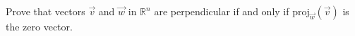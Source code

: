 \begin{problem}
Prove that vectors $\vec{v}$ and $\vec{w}$ in $\mathbb{R}^n$ are perpendicular if and only if $\textrm{proj}_{\vec{w}}(\vec{v})$ is the zero vector.
\end{problem}